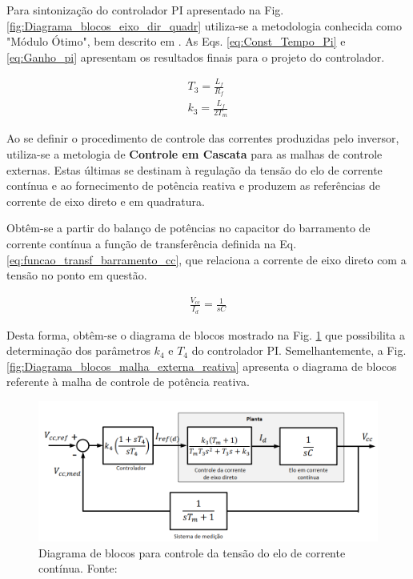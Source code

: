 Para sintonização do controlador PI apresentado na Fig. \ref{fig:Diagrama_blocos_eixo_dir_quadr} utiliza-se a metodologia conhecida como "Módulo Ótimo", bem descrito em \cite{ArticleRezek}. As Eqs. \ref{eq:Const_Tempo_Pi} e \ref{eq:Ganho_pi} apresentam os resultados finais para o projeto do controlador.

\begin{align}
	T_3 = \frac{L_f}{R_f}\label{eq:Const_Tempo_Pi}\\
	k_3 = \frac{L_f}{2T_m}\label{eq:Ganho_pi}
\end{align}

Ao se definir o procedimento de controle das correntes produzidas pelo inversor, utiliza-se a metologia de \textbf{Controle em Cascata} para as malhas de controle externas. Estas últimas se destinam à regulação da tensão do elo de corrente contínua e ao fornecimento de potência reativa e produzem as referências de corrente de eixo direto e em quadratura.

Obtêm-se a partir do balanço de potências no capacitor do barramento de corrente contínua a função de transferência definida na Eq. \ref{eq:funcao_transf_barramento_cc}, que relaciona a corrente de eixo direto com a tensão no ponto em questão.

\begin{align}\label{eq:funcao_transf_barramento_cc}
	\frac{V_{cc}}{I_d} = \frac{1}{sC}
\end{align}

Desta forma, obtêm-se o diagrama de blocos mostrado na Fig. \ref{fig:Diagrama_blocos_malha_externa} que possibilita a determinação dos parâmetros $k_4$ e $T_4$ do controlador PI. Semelhantemente, a Fig. \ref{fig:Diagrama_blocos_malha_externa_reativa} apresenta o diagrama de blocos referente à malha de controle de potência reativa.

\begin{figure}[!hbt]
	\begin{center}
		\includegraphics[width=0.85\columnwidth]{figuras/Diagram_Blocos_Malha_Externa.PNG}
		\caption{Diagrama de blocos para controle da tensão do elo de corrente contínua. Fonte: \cite{TeseProfAlex}}
		\label{fig:Diagrama_blocos_malha_externa}
	\end{center}
\end{figure}


